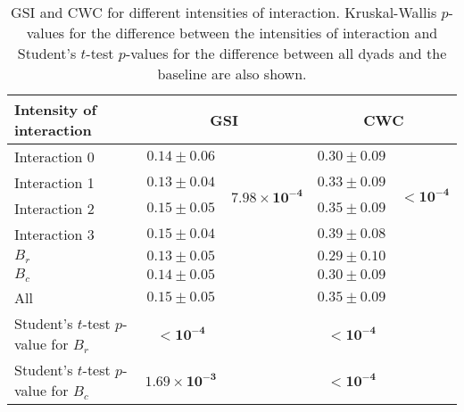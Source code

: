 \begin{table}
\centering
\caption{GSI and CWC for different intensities of interaction. Kruskal-Wallis $p$-values for the difference between the intensities of interaction and Student's $t$-test $p$-values for the difference between all dyads and the baseline are also shown.}
\label{tab:sync_stats}
\begin{tabular}{lcccc}
\toprule
Intensity of interaction & \multicolumn{2}{c}{GSI} & \multicolumn{2}{c}{CWC} \\
\midrule
Interaction 0 & $0.14 \pm 0.06$ & \multirow{4}{*}{$\mathbf{7.98 \times 10^{-4}}$} &$0.30 \pm 0.09$ & \multirow{4}{*}{$\mathbf{< 10^{-4}}$} \\
Interaction 1 & $0.13 \pm 0.04$ & &$0.33 \pm 0.09$ & \\
Interaction 2 & $0.15 \pm 0.05$ & &$0.35 \pm 0.09$ & \\
Interaction 3 & $0.15 \pm 0.04$ & &$0.39 \pm 0.08$ & \\
\midrule
$B_r$ & $0.13 \pm 0.05$ & &$0.29 \pm 0.10$ & \\
$B_c$ & $0.14 \pm 0.05$ & &$0.30 \pm 0.09$ & \\
\midrule
All & $0.15 \pm 0.05$ & & $0.35 \pm 0.09$ & \\
\midrule
Student's $t$-test $p$-value for $B_r$ & $\mathbf{< 10^{-4}}$ & & $\mathbf{< 10^{-4}}$  &\\
Student's $t$-test $p$-value for $B_c$ & $\mathbf{1.69 \times 10^{-3}}$ &  &$\mathbf{< 10^{-4}}$ &\\
\bottomrule
\end{tabular}
\end{table}
